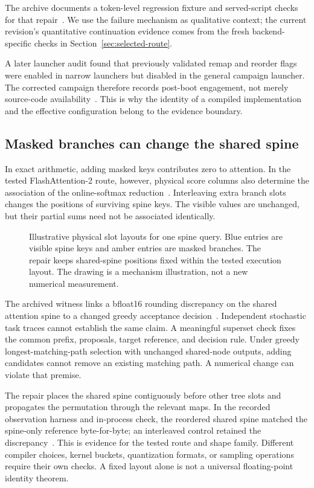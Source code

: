 \documentclass[conference]{IEEEtran}
\begin{document}
The archive documents a token-level regression fixture and served-script checks for that repair~\cite{lumo2026stateless}. We use the failure mechanism as qualitative context; the current revision's quantitative continuation evidence comes from the fresh backend-specific checks in Section~\ref{sec:selected-route}.

A later launcher audit found that previously validated remap and reorder flags were enabled in narrow launchers but disabled in the general campaign launcher. The corrected campaign therefore records post-boot engagement, not merely source-code availability~\cite{lumo2026archive}. This is why the identity of a compiled implementation and the effective configuration belong to the evidence boundary.

\subsection{Masked branches can change the shared spine}
In exact arithmetic, adding masked keys contributes zero to attention. In the tested FlashAttention-2 route, however, physical score columns also determine the association of the online-softmax reduction~\cite{dao2023flashattention,lumo2026spine}. Interleaving extra branch slots changes the positions of surviving spine keys. The visible values are unchanged, but their partial sums need not be associated identically.

\begin{figure}[t]
\centering

\caption{Illustrative physical slot layouts for one spine query. Blue entries are visible spine keys and amber entries are masked branches. The repair keeps shared-spine positions fixed within the tested execution layout. The drawing is a mechanism illustration, not a new numerical measurement.}
\label{fig:layout}
\end{figure}

The archived witness links a bfloat16 rounding discrepancy on the shared attention spine to a changed greedy acceptance decision~\cite{lumo2026spine}. Independent stochastic task traces cannot establish the same claim. A meaningful superset check fixes the common prefix, proposals, target reference, and decision rule. Under greedy longest-matching-path selection with unchanged shared-node outputs, adding candidates cannot remove an existing matching path. A numerical change can violate that premise.

The repair places the shared spine contiguously before other tree slots and propagates the permutation through the relevant maps. In the recorded observation harness and in-process check, the reordered shared spine matched the spine-only reference byte-for-byte; an interleaved control retained the discrepancy~\cite{lumo2026spine}. This is evidence for the tested route and shape family. Different compiler choices, kernel buckets, quantization formats, or sampling operations require their own checks. A fixed layout alone is not a universal floating-point identity theorem.
\end{document}
